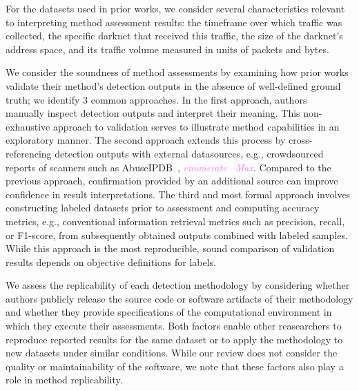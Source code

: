 \documentclass[manuscript,nonacm]{acmart}
\newcommand{\maxnote}[1]{\textit{\textcolor{violet}{#1 --Max}}}
\begin{document}
\vspace{0.25em}
For the datasets used in prior works, we consider several characteristics relevant to interpreting method assessment results:
the timeframe over which traffic was collected, the specific darknet that received this traffic, the size of the darknet's address space, and its traffic volume measured in units of packets and bytes.

\vspace{0.25em}
We consider the soundness of method assessments by examining how prior works validate their method's detection outputs in the absence of well-defined ground truth; we identify 3 common approaches.
In the first approach, authors~\cite{@@} manually inspect detection outputs and interpret their meaning. This non-exhaustive approach to validation serves to illustrate method capabilities in an exploratory manner.
The second approach extends this process by cross-referencing detection outputs with external datasources, e.g., crowdsourced reports of scanners such as AbuseIPDB~\cite{@@}, \maxnote{enumerate}. Compared to the previous approach, confirmation provided by an additional source can improve confidence in result interpretations.
The third and most formal approach involves constructing labeled datasets prior to assessment and computing accuracy metrics, e.g., conventional information retrieval metrics such as precision, recall, or F1-score, from subsequently obtained outputs combined with labeled samples. While this approach is the most reproducible, sound comparison of validation results depends on objective definitions for labels.


\vspace{0.25em}
We assess the replicability of each detection methodology by considering whether authors publicly release the source code or software artifacts of their methodology and whether they provide specifications of the computational environment in which they execute their assessments. 
Both factors enable other reasearchers to reproduce reported results for the same dataset or to apply the methodology to new datasets under similar conditions. 
While our review does not consider the quality or maintainability of the software, we note that these factors also play a role in method replicability.
\end{document}
